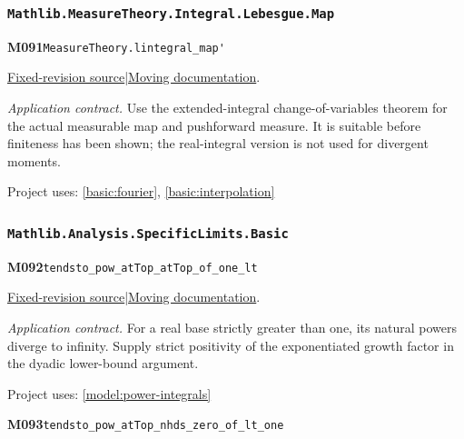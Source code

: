 \documentclass[11pt,a4paper]{article}
\theoremstyle{definition}
\theoremstyle{remark}
\begin{document}
\subsubsection*{\nolinkurl{Mathlib.MeasureTheory.Integral.Lebesgue.Map}}
\noindent\textbf{M091}\label{base:M091}\quad\nolinkurl{MeasureTheory.lintegral_map'}

\href{https://github.com/leanprover-community/mathlib4/blob/9bac2d0692944a775113f7c130fd5e5b4608a854/Mathlib/MeasureTheory/Integral/Lebesgue/Map.lean}{Fixed-revision source}\quad|\quad\href{https://leanprover-community.github.io/mathlib4_docs/Mathlib/MeasureTheory/Integral/Lebesgue/Map.html#MeasureTheory.lintegral_map'}{Moving documentation}.\par
\noindent\textit{Application contract.} Use the extended-integral change-of-variables theorem for the actual measurable map and pushforward measure. It is suitable before finiteness has been shown; the real-integral version is not used for divergent moments.\par
{\small Project uses: \ref{basic:fourier}, \ref{basic:interpolation}}\par\medskip

\subsubsection*{\nolinkurl{Mathlib.Analysis.SpecificLimits.Basic}}
\noindent\textbf{M092}\label{base:M092}\quad\nolinkurl{tendsto_pow_atTop_atTop_of_one_lt}

\href{https://github.com/leanprover-community/mathlib4/blob/9bac2d0692944a775113f7c130fd5e5b4608a854/Mathlib/Analysis/SpecificLimits/Basic.lean}{Fixed-revision source}\quad|\quad\href{https://leanprover-community.github.io/mathlib4_docs/Mathlib/Analysis/SpecificLimits/Basic.html#tendsto_pow_atTop_atTop_of_one_lt}{Moving documentation}.\par
\noindent\textit{Application contract.} For a real base strictly greater than one, its natural powers diverge to infinity. Supply strict positivity of the exponentiated growth factor in the dyadic lower-bound argument.\par
{\small Project uses: \ref{model:power-integrals}}\par\medskip

\noindent\textbf{M093}\label{base:M093}\quad\nolinkurl{tendsto_pow_atTop_nhds_zero_of_lt_one}
\end{document}
